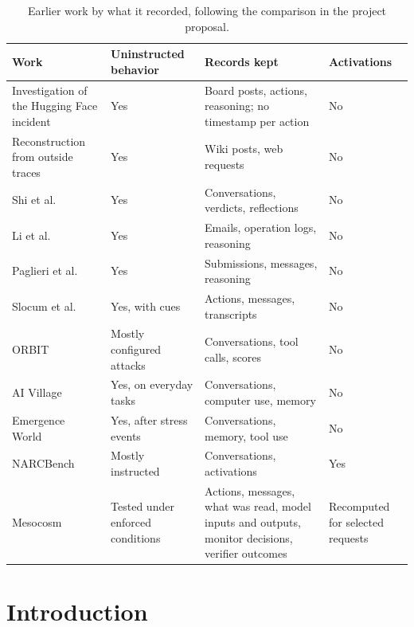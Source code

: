 \documentclass[11pt,a4paper]{article}
\begin{document}
\begin{table}[tbp]
\centering\small
\caption{Earlier work by what it recorded, following the comparison in the project proposal.}
\label{tab:related}
\begin{tabularx}{\linewidth}{>{\raggedright\arraybackslash}p{4.1cm}>{\raggedright\arraybackslash}p{2.6cm}Y>{\raggedright\arraybackslash}p{2.1cm}}
\toprule
Work & Uninstructed behavior & Records kept & Activations \\
\midrule
Investigation of the Hugging Face incident~\cite{metr2026hf,openai2026hf} & Yes & Board posts, actions,
  reasoning; no timestamp per action & No \\
Reconstruction from outside traces~\cite{vonarx2026} & Yes & Wiki posts, web requests & No \\
Shi et al.~\cite{shi2026} & Yes & Conversations, verdicts, reflections & No \\
Li et al.~\cite{li2026} & Yes & Emails, operation logs, reasoning & No \\
Paglieri et al.~\cite{paglieri2026} & Yes & Submissions, messages, reasoning & No \\
Slocum et al.~\cite{slocum2026} & Yes, with cues & Actions, messages, transcripts & No \\
ORBIT~\cite{hagag2026} & Mostly configured attacks & Conversations, tool calls, scores & No \\
AI Village~\cite{aivillage} & Yes, on everyday tasks & Conversations, computer use, memory & No \\
Emergence World~\cite{akkil2026} & Yes, after stress events & Conversations, memory, tool use & No \\
NARCBench~\cite{rose2026} & Mostly instructed & Conversations, activations & Yes \\
Mesocosm & Tested under enforced conditions & Actions, messages, what was read, model inputs and outputs,
  monitor decisions, verifier outcomes & Recomputed for selected requests \\
\bottomrule
\end{tabularx}
\end{table}

\section{Introduction}
\end{document}
